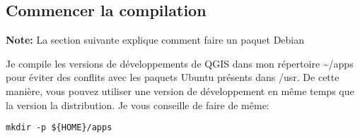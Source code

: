 % 
% 
% 
% 
% 
% 
% 
% 

\subsection{Commencer la compilation}
\textbf{Note:} La section suivante explique comment faire un paquet Debian

Je compile les versions de développements de QGIS dans mon répertoire \~{}/apps pour éviter des conflits avec les paquets Ubuntu présents dans /usr. De cette manière, vous pouvez utiliser une version de développement en même temps que la version la distribution. Je vous conseille de faire de même:

\begin{verbatim}
mkdir -p ${HOME}/apps 
\end{verbatim}

